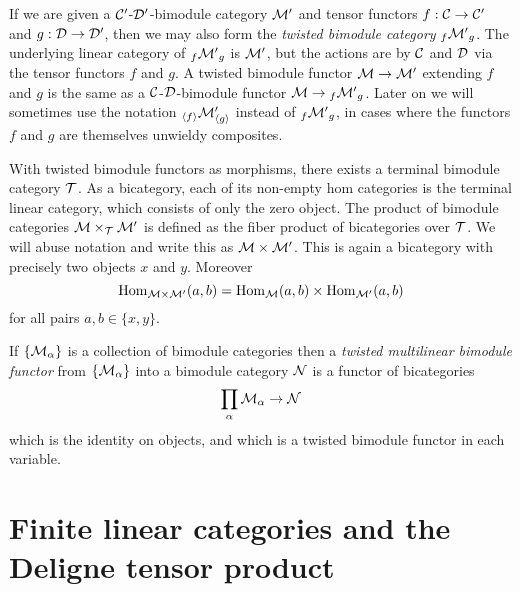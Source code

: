 \documentclass{amsart}
\begin{document}
If we are given a $\mathcal C'$-$\mathcal D'$-bimodule category $\mathcal M'$ and tensor functors $f:\mathcal C \to \mathcal C'$ and $g:\mathcal D \to \mathcal D'$, then we may also form the {\em twisted bimodule category} ${}_f{\mathcal M'}_g$.  The underlying linear category of ${}_f{\mathcal M'}_g$ is $\mathcal M'$, but the actions are by $\mathcal C$ and $\mathcal D$ via the tensor functors $f$ and $g$. A twisted bimodule functor $\mathcal M \to \mathcal M'$ extending $f$ and $g$ is the same as a $\mathcal C$-$\mathcal D$-bimodule functor $\mathcal M \to {}_f{\mathcal M'}_g$.  Later on we will sometimes use the notation ${}_{\langle f \rangle} \mathcal M'_{\langle g \rangle}$ instead of ${}_f{\mathcal M'}_g$, in cases where the functors $f$ and $g$ are themselves unwieldy composites.

With twisted bimodule functors as morphisms, there exists a terminal bimodule category $\mathcal T$. As a bicategory, each of its non-empty hom categories is the terminal linear category, which consists of only the zero object. %
The product of bimodule categories $\mathcal M \times_{\mathcal T} \mathcal M'$ is defined as the fiber product of bicategories over $\mathcal T$.     We will abuse notation and write this as $\mathcal M \times \mathcal M'$. This is again a bicategory with precisely two objects $x$ and $y$. Moreover
\begin{equation*}
	\operatorname{Hom}_{\mathcal M \times \mathcal M'}(a,b) = \operatorname{Hom}_\mathcal M(a,b) \times \operatorname{Hom}_{\mathcal M'}(a,b)
\end{equation*}
for all pairs $a,b \in \{ x,y \}$.

If $\{ \mathcal M_\alpha \}$ is a collection of bimodule categories then a {\em twisted multilinear bimodule functor} from $\{ \mathcal M_\alpha \}$ into a bimodule category $\mathcal N$ is a functor of bicategories
\begin{equation*}
	\prod_{\alpha} \mathcal M_\alpha \to \mathcal N
\end{equation*}
which is the identity on objects, and which is a twisted bimodule functor in each variable. 

\section{Finite linear categories and the Deligne tensor product} \label{sec-tc-deligne}
\end{document}
